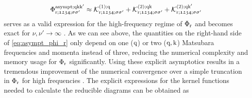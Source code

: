 \documentclass[../../main.tex]{subfiles}
\begin{document}
\begin{align}\label{eq:asympt_phi_r}
	\Phi_{\text{r};\mathfrak{1234};\sigma\sigma'}^{\text{asympt};\text{q}\text{k}\text{k}'}\approx\mathcal{K}^{(1);\text{q}}_{\text{r};\mathfrak{1234};\sigma\sigma'}+\mathcal{K}^{(2);\text{q}\text{k}}_{\text{r};\mathfrak{1234};\sigma\sigma'}+\mathcal{K}^{(2);\text{q}\text{k}'}_{\text{r};\mathfrak{1234};\sigma\sigma'}
\end{align}
serves as a valid expression for the high-frequency regime of $\Phi_{\text{r}}$ and becomes exact for $\nu,\nu'\to\infty$ \cite{Wentzell2020}. As we can see above, the quantities on the right-hand side of \eqref{eq:asympt_phi_r} only depend on one ($\text{q}$) or two ($\text{q},\text{k}$) Matsubara frequencies and momenta instead of three, reducing the numerical complexity and memory usage for $\Phi_{\text{r}}$ significantly. Using these explicit asymptotics results in a tremendous improvement of the numerical convergence over a simple truncation in $\Phi_{\text{r}}$ for high frequencies \cite{Wentzell2020}. The explicit expressions for the kernel functions needed to calculate the reducible diagrams can be obtained as \cite{Galler2018, Kaufmann2017, Pudleiner2019}
\end{document}
